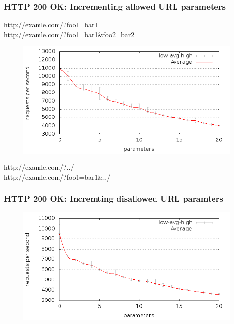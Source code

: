 \begin{frame}[noframenumbering]
  \frametitle{HTTP 200 OK: Incrementing allowed URL parameters}

  \mbox{http://examle.com/?foo1=bar1}\\
  \mbox{http://examle.com/?foo1=bar1\&foo2=bar2}

  \begin{figure}[H]
  \centering
  \includegraphics[scale=0.5] {../paper/images/results/200_with_naxsi_incremented_allowed_parameters/output.png}
  \end{figure}
\end{frame}

\begin{frame}[noframenumbering]
  \mbox{http://examle.com/?../}\\
  \mbox{http://examle.com/?foo1=bar1\&../}

  \frametitle{HTTP 200 OK: Incremting disallowed URL paramters}
  \begin{figure}[H]
  \centering
  \includegraphics[scale=0.5] {../paper/images/results/200_with_naxsi_incremented_disallowed_parameters/output.png}
  \end{figure}
\end{frame}

